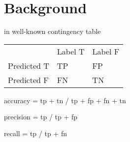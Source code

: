 \section{Background}

in well-known contingency table

\begin{center}
\begin{tabular}{l|l|l|} 
\multicolumn{1}{l}{} &  \multicolumn{1}{l}{Label T} & \multicolumn{1}{l}{Label F} \\ \cline{2-3}
Predicted T & TP & FP \\ \cline{2-3}
Predicted F & FN & TN \\ \cline{2-3}
\end{tabular}
\end{center}

accuracy = tp + tn / tp + fp + fn + tn

precision = tp / tp + fp

recall = tp / tp + fn
